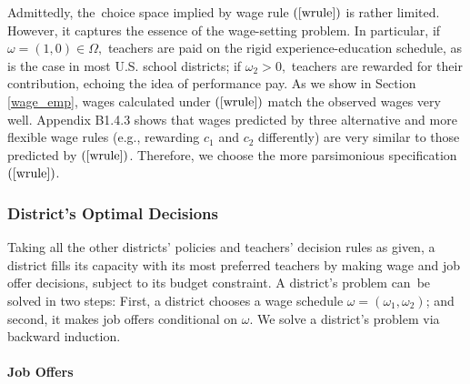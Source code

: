 \documentclass[notitlepage,12pt]{article}%
\begin{document}
Admittedly, the\ choice space implied by wage rule $\left(  \ref{wrule}%
\right)  $ is rather limited. However, it captures the essence of the
wage-setting problem. In particular, if $\omega=\left(  1,0\right)  \in
\Omega,$ teachers are paid on the rigid experience-education schedule, as is
the case in most U.S. school districts; if $\omega_{2}>0,$ teachers are
rewarded for their contribution, echoing the idea of performance pay. As we
show in Section \ref{wage_emp}, wages calculated under $\left(  \ref{wrule}%
\right)  $ match the observed wages very well. Appendix B1.4.3 shows
that wages predicted by three alternative and more flexible wage rules (e.g.,
rewarding $c_{1}$ and $c_{2}$ differently) are very similar to those predicted
by $\left(  \ref{wrule}\right)  $. Therefore, we choose the more parsimonious
specification $\left(  \ref{wrule}\right)  $.

\subsubsection{District's Optimal Decisions}

Taking all the other districts' policies and teachers' decision rules as
given, a district fills its capacity with its most preferred teachers by
making wage and job offer decisions, subject to its budget constraint. A
district's problem can\ be solved in two steps: First, a district chooses a
wage schedule $\omega=\left(  \omega_{1},\omega_{2}\right)  $; and second, it
makes job offers conditional on $\omega$. We solve a district's problem via
backward induction.

\paragraph{Job Offers}
\end{document}
